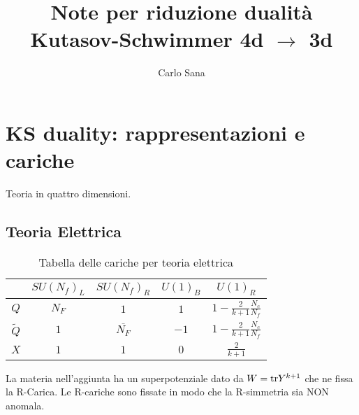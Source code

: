 \documentclass[a4paper,12pt]{article}
\title{Note per riduzione dualità Kutasov-Schwimmer 4d $\rightarrow$ 3d}
\author{Carlo Sana}
\begin{document}
\maketitle
\newpage
\section*{KS duality: rappresentazioni e cariche}
Teoria in quattro dimensioni.
\subsection*{Teoria Elettrica}
\begin{table}[h!]
\begin{tabular}{c c c c c }
 & $SU(N_f)_L$  &$SU(N_f)_R $  & $U(1)_B$ &  $U(1)_R$ \\
\hline
$Q$ & $N_F$ & $1$   &  $1$  & $ 1 - \frac{2}{k+1} \frac{N_c}{N_f}$  \\
$\tilde{Q}$  &  $1$ & $\overline{ N_F}$   & $-1$   &  $ 1 - \frac{2}{k+1} \frac{N_c}{N_f} $   \\
$X$ & $1$   &$ 1$    &$ 0$   &  $\frac{2}{k+1}$ \\
\end{tabular}
\caption{Tabella delle cariche per teoria elettrica}
\label{table:charge_table_el_ks_4d}
\end{table}
La materia nell'aggiunta ha un superpotenziale dato da $ W = \hbox{tr} Y^{k+1}$ che ne fissa la R-Carica.
Le R-cariche sono fissate in modo che la R-simmetria sia NON anomala.\\
\end{document}
